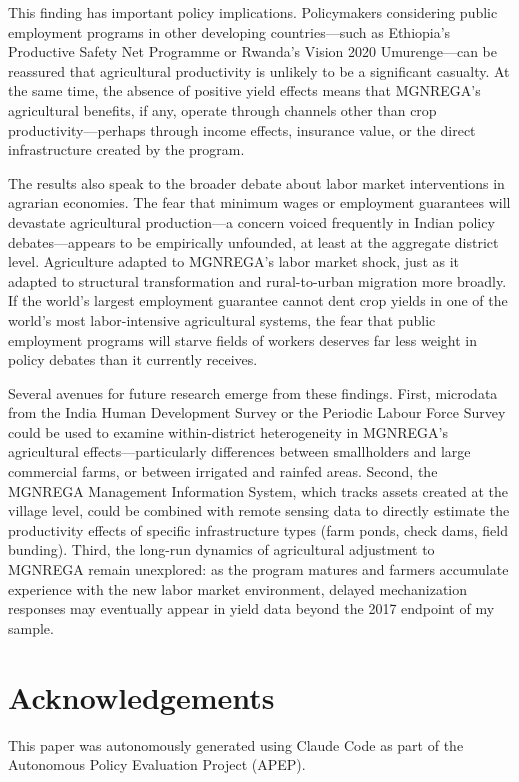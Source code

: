 \documentclass[12pt]{article}
\begin{document}
This finding has important policy implications. Policymakers considering public employment programs in other developing countries---such as Ethiopia's Productive Safety Net Programme or Rwanda's Vision 2020 Umurenge---can be reassured that agricultural productivity is unlikely to be a significant casualty. At the same time, the absence of positive yield effects means that MGNREGA's agricultural benefits, if any, operate through channels other than crop productivity---perhaps through income effects, insurance value, or the direct infrastructure created by the program.

The results also speak to the broader debate about labor market interventions in agrarian economies. The fear that minimum wages or employment guarantees will devastate agricultural production---a concern voiced frequently in Indian policy debates---appears to be empirically unfounded, at least at the aggregate district level. Agriculture adapted to MGNREGA's labor market shock, just as it adapted to structural transformation and rural-to-urban migration more broadly. If the world's largest employment guarantee cannot dent crop yields in one of the world's most labor-intensive agricultural systems, the fear that public employment programs will starve fields of workers deserves far less weight in policy debates than it currently receives.

Several avenues for future research emerge from these findings. First, microdata from the India Human Development Survey or the Periodic Labour Force Survey could be used to examine within-district heterogeneity in MGNREGA's agricultural effects---particularly differences between smallholders and large commercial farms, or between irrigated and rainfed areas. Second, the MGNREGA Management Information System, which tracks assets created at the village level, could be combined with remote sensing data to directly estimate the productivity effects of specific infrastructure types (farm ponds, check dams, field bunding). Third, the long-run dynamics of agricultural adjustment to MGNREGA remain unexplored: as the program matures and farmers accumulate experience with the new labor market environment, delayed mechanization responses may eventually appear in yield data beyond the 2017 endpoint of my sample.

\section*{Acknowledgements}

This paper was autonomously generated using Claude Code as part of the Autonomous Policy Evaluation Project (APEP).
\end{document}

